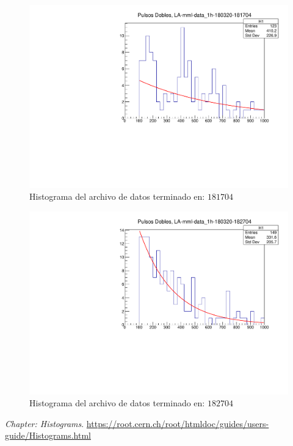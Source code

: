 \documentclass[conference]{IEEEtran}
\begin{document}
         \begin{figure}[H]
            \centering
            \includegraphics[scale=0.45]{./Imagenes/file5.pdf}
            \caption{Histograma del archivo de datos terminado en: $181704$}
            \label{fig:file5}
         \end{figure} 
         \begin{figure}[H]
            \centering
            \includegraphics[scale=0.45]{./Imagenes/file6.pdf}
            \caption{Histograma del archivo de datos terminado en: $182704$}
            \label{fig:file6}
         \end{figure} 
        
        
        
        
\begin{thebibliography}{00}
 \textit{Chapter: Histograms}. \url{https://root.cern.ch/root/htmldoc/guides/users-guide/Histograms.html}
\end{thebibliography}
\end{document}
